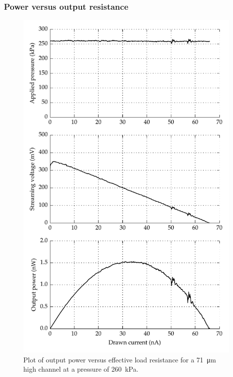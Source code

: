     \subsubsection*{Power versus output resistance}


      \begin{figure}
          \centering
          \includegraphics{content/pt1/01-PowerHarvesting/graphics/graph_streamingCell_outputPower_resistanceSweep}
          \caption{\label{fig:streamingCell_maxPower}Plot of output power versus effective load resistance for a \SI{71}{\micro\metre} high channel at a pressure of \SI{260}{\kilo\pascal}.}
      \end{figure}

